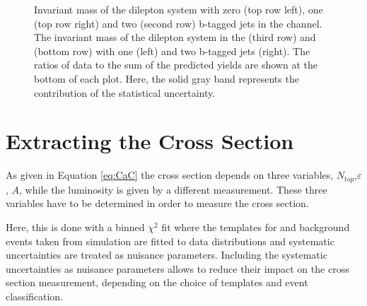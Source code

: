 \begin{figure}[htbp!]
\begin{center}

      \caption{Invariant mass of the dilepton system with zero (top row left), one (top row right) and two (second row) b-tagged 
      jets in the \emu channel. The invariant mass of the dilepton system in the \mumu (third row) and \ee (bottom row) with one (left)
      and two b-tagged jets (right).
        The ratios of data to the sum of the predicted yields are
        shown at the bottom of each plot. Here, the solid gray band
        represents the contribution of the statistical uncertainty.}  
       \label{fig:xsec_ctrplots_mll}
  \end{center}
\end{figure}


\section{Extracting the Cross Section}
\label{sec:xsec_fit}

As given in Equation \ref{eq:CaC} the cross section depends on three variables, $N_{top}$,$\varepsilon$, $A$, while the luminosity is given by a different measurement.
These three variables have to be determined in order to measure the cross section. 

Here, this is done with a binned $\chi^2$ fit where the templates for \ttbar and background events taken from simulation are fitted to data distributions and systematic uncertainties are treated as nuisance parameters.
Including the systematic uncertainties as nuisance parameters allows to reduce their impact on the cross section measurement, depending on the choice of templates and event classification.



